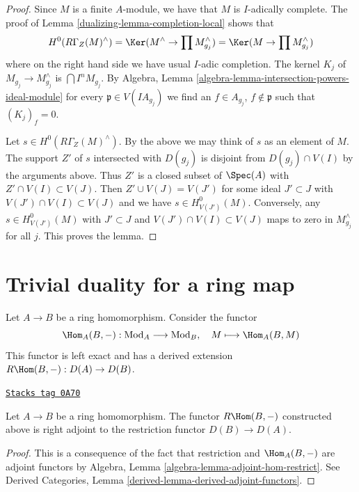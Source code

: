 \begin{proof}

Since $M$ is a finite $A$-module, we have that $M$ is $I$-adically complete.
The proof of Lemma \ref{dualizing-lemma-completion-local} shows that
$$
H^0(R\Gamma_Z(M)^\wedge) =
\Ker(M^\wedge \to \prod M_{g_j}^\wedge) =
\Ker(M \to \prod M_{g_j}^\wedge)
$$
where on the right hand side we have usual $I$-adic completion.
The kernel $K_j$ of $M_{g_j} \to M_{g_j}^\wedge$ is $\bigcap I^n M_{g_j}$.
By Algebra, Lemma \ref{algebra-lemma-intersection-powers-ideal-module}
for every $\mathfrak p \in V(IA_{g_j})$ we find an
$f \in A_{g_j}$, $f \not \in \mathfrak p$ such that $(K_j)_f = 0$.

\medskip\noindent
Let $s \in H^0(R\Gamma_Z(M)^\wedge)$.
By the above we may think of $s$ as an element of $M$.
The support $Z'$ of $s$ intersected with $D(g_j)$ is disjoint from
$D(g_j) \cap V(I)$ by the arguments above.
Thus $Z'$ is a closed subset of $\Spec(A)$ with $Z' \cap V(I) \subset V(J)$.
Then $Z' \cup V(J) = V(J')$ for some ideal $J' \subset J$ with
$V(J') \cap V(I) \subset V(J)$ and we have $s \in H^0_{V(J')}(M)$.
Conversely, any $s \in H^0_{V(J')}(M)$ with $J' \subset J$ and
$V(J') \cap V(I) \subset V(J)$ maps to zero in $M_{g_j}^\wedge$ for all $j$.
This proves the lemma.
\end{proof}

\section{Trivial duality for a ring map}
\label{dualizing-section-trivial}
Let $A \to B$ be a ring homomorphism. Consider the functor
$$
\Hom_A(B, -) : \text{Mod}_A \longrightarrow \text{Mod}_B,\quad
M \longmapsto \Hom_A(B, M)
$$
This functor is left exact and has a derived extension
$R\Hom(B, -) : D(A) \to D(B)$.

\begin{lemma}
\label{dualizing-lemma-right-adjoint}
\href{https://stacks.math.columbia.edu/tag/0A70}{\texttt{Stacks tag 0A70}}

Let $A \to B$ be a ring homomorphism. The functor $R\Hom(B, -)$
constructed above is right adjoint to the restriction functor
$D(B) \to D(A)$.
\end{lemma}

\begin{proof}
This is a consequence of the fact that restriction and $\Hom_A(B, -)$ are
adjoint functors by Algebra, Lemma \ref{algebra-lemma-adjoint-hom-restrict}.
See Derived Categories, Lemma \ref{derived-lemma-derived-adjoint-functors}.
\end{proof}

